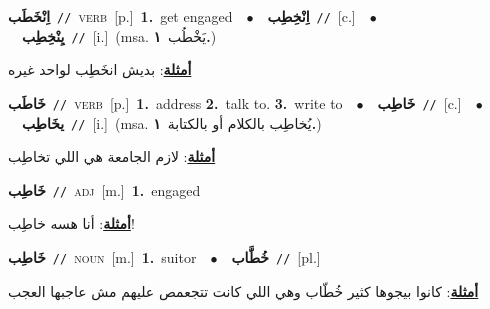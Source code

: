 \documentclass[10pt,a4paper,twoside]{article} %
\begin{document}
\begin{multicols}{2}
{\setlength\topsep{0pt}\textbf{\foreignlanguage{arabic}{اِنْخَطَب}}\ {\color{gray}\texttt{//}\color{black}}\ \textsc{verb}\ [p.]\ \textbf{1.}~get engaged\ \ $\bullet$\ \ \setlength\topsep{0pt}\textbf{\foreignlanguage{arabic}{اِنْخِطِب}}\ {\color{gray}\texttt{//}\color{black}}\ [c.]\ \ $\bullet$\ \ \setlength\topsep{0pt}\textbf{\foreignlanguage{arabic}{يِنْخِطِب}}\ {\color{gray}\texttt{//}\color{black}}\ [i.]\ \color{gray}(msa. \foreignlanguage{arabic}{يَخْطُب}~\foreignlanguage{arabic}{\textbf{١.}})\color{black}\  \begin{flushright}\color{gray}\foreignlanguage{arabic}{\textbf{\underline{\foreignlanguage{arabic}{أمثلة}}}: بديش انخَطِب لواحد غيره}\end{flushright}\color{black}} \vspace{2mm}

{\setlength\topsep{0pt}\textbf{\foreignlanguage{arabic}{خَاطَب}}\ {\color{gray}\texttt{//}\color{black}}\ \textsc{verb}\ [p.]\ \textbf{1.}~address  \textbf{2.}~talk to.  \textbf{3.}~write to\ \ $\bullet$\ \ \setlength\topsep{0pt}\textbf{\foreignlanguage{arabic}{خَاطِب}}\ {\color{gray}\texttt{//}\color{black}}\ [c.]\ \ $\bullet$\ \ \setlength\topsep{0pt}\textbf{\foreignlanguage{arabic}{يخَاطِب}}\ {\color{gray}\texttt{//}\color{black}}\ [i.]\ \color{gray}(msa. \foreignlanguage{arabic}{يُخاطِب بالكلام أو بالكتابة}~\foreignlanguage{arabic}{\textbf{١.}})\color{black}\  \begin{flushright}\color{gray}\foreignlanguage{arabic}{\textbf{\underline{\foreignlanguage{arabic}{أمثلة}}}: لازم الجامعة هي اللي تخاطِب}\end{flushright}\color{black}} \vspace{2mm}

{\setlength\topsep{0pt}\textbf{\foreignlanguage{arabic}{خَاطِب}}\ {\color{gray}\texttt{//}\color{black}}\ \textsc{adj}\ [m.]\ \textbf{1.}~engaged\  \begin{flushright}\color{gray}\foreignlanguage{arabic}{\textbf{\underline{\foreignlanguage{arabic}{أمثلة}}}: أنا  هسه خاطِب!}\end{flushright}\color{black}} \vspace{2mm}

{\setlength\topsep{0pt}\textbf{\foreignlanguage{arabic}{خَاطِب}}\ {\color{gray}\texttt{//}\color{black}}\ \textsc{noun}\ [m.]\ \textbf{1.}~suitor\ \ $\bullet$\ \ \setlength\topsep{0pt}\textbf{\foreignlanguage{arabic}{خُطَّاب}}\ {\color{gray}\texttt{//}\color{black}}\ [pl.]\  \begin{flushright}\color{gray}\foreignlanguage{arabic}{\textbf{\underline{\foreignlanguage{arabic}{أمثلة}}}: كانوا بيجوها كثير خُطّاب وهي اللي كانت تتجعمص عليهم مش عاجبها العجب}\end{flushright}\color{black}} \vspace{2mm}


\end{multicols}
\end{document}
